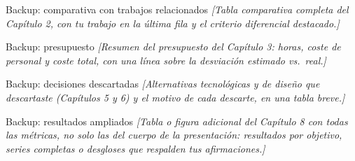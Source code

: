 \documentclass[11pt, aspectratio=169]{beamer}
\newcommand{\ph}[1]{\texorpdfstring{\textcolor{grisplaceholder}{\textit{[#1]}}}{[#1]}}
\newcounter{framefinal}
\newcommand{\backupend}{\setcounter{framenumber}{\value{framefinal}}}
\begin{document}
\begin{frame}{Backup: comparativa con trabajos relacionados}
  \ph{Tabla comparativa completa del Capítulo 2, con tu trabajo en la
  última fila y el criterio diferencial destacado.}
\end{frame}

\begin{frame}{Backup: presupuesto}
  \ph{Resumen del presupuesto del Capítulo 3: horas, coste de personal
  y coste total, con una línea sobre la desviación estimado vs.\ real.}
\end{frame}

\begin{frame}{Backup: decisiones descartadas}
  \ph{Alternativas tecnológicas y de diseño que descartaste (Capítulos
  5 y 6) y el motivo de cada descarte, en una tabla breve.}
\end{frame}

\begin{frame}{Backup: resultados ampliados}
  \ph{Tabla o figura adicional del Capítulo 8 con todas las métricas,
  no solo las del cuerpo de la presentación: resultados por objetivo,
  series completas o desgloses que respalden tus afirmaciones.}
\end{frame}

\backupend
\end{document}
